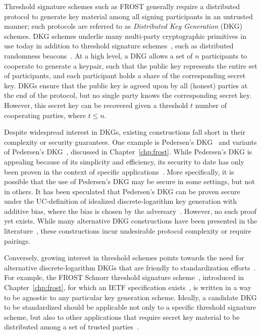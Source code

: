 Threshold signature schemes such as FROST generally require a distributed
protocol to generate key material among all signing participants in an
untrusted manner;
such protocols are referred to as \emph{Distributed Key Generation} (DKG) schemes.
DKG schemes underlie many
multi-party cryptographic primitives in use today in addition to threshold signature schemes~\cite{KomloG20,BellareCKMTZ22,Lindell22},
such as distributed randomness beacons~\cite{le19}.
At a high level, a DKG allows a set of $n$ participants to cooperate to generate a keypair,
such that the public key represents the entire set of participants,
and each participant holds a share of the corresponding secret key.
DKGs ensure that the public key is agreed upon by all (honest) parties at the end of the protocol,
but no single party knows the corresponding secret key.
However, this secret key can be recovered given a threshold $t$ number of cooperating parties,
where $t \leq n$.

Despite widespread interest in DKGs,
existing constructions fall short in their complexity or security guarantees.
One example is Pedersen's DKG~\cite{Pedersen91} and variants of Pedersen's DKG~\cite{KomloG20,BellareCKMTZ22},
discussed in Chapter~\ref{chp:frost}.
While Pedersen's DKG is appealing because of its simplicity and efficiency,
its security to date has only been proven in the context of specific applications~\cite{GennaroJKR03,GurkanJMMST21,BellareCKMTZ22}.
More specifically,
it is possible that the use of Pedersen's DKG may be secure in some settings, but not in others.
It has been speculated that Pedersen's DKG can be proven secure under the
UC-definition of idealized discrete-logarithm key generation with additive bias,
where the bias is chosen by the adversary~\cite{Katz24}.
However, no such proof yet exists.
While many alternative DKG constructions have been presented in the literature~\cite{GennaroJKR07,Groth21,GurkanJMMST21,BonehS2020,NejiBR16,Lindell22,DasYXMKR21,BachoL22,AbrahamJMMS2022},
these constructions incur undesirable protocol complexity or require pairings.

Conversely, growing interest in threshold schemes points
towards the need for alternative discrete-logarithm DKGs that are friendly to standardization efforts~\cite{NIST22,NIST23}.
For example, the FROST Schnorr threshold signature scheme~\cite{KomloG20,BellareCKMTZ22},
introduced in Chapter~\ref{chp:frost},
for which an IETF specification exists~\cite{Connolly22},
is written in a way to be agnostic to any particular key generation scheme.
Ideally, a candidate DKG to be standardized should be applicable not only to
a specific threshold signature scheme,
but also to other applications that require secret key material to be distributed
among a set of trusted parties~\cite{DavidsonSSW22}.

